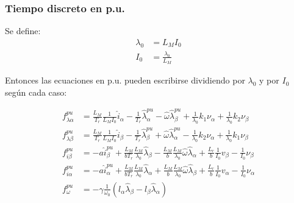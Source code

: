 \documentclass{article}
\begin{document}
        \subsubsection{Tiempo discreto en p.u.}
            Se define:
            \begin{align}
                \lambda_0 &= L_M I_0 \\
                I_0 &= \frac{\lambda_0}{L_M} 
            \end{align}

            Entonces las ecuaciones en p.u. pueden escribirse dividiendo por $\lambda_0$ y por $I_0$  según cada caso:
            
            \begin{equation}
                \begin{aligned}
                    f_{\lambda\alpha}^{pu} &=  \frac{L_M}{T_r} \frac{1}{L_M I_0} \hat{i}_\alpha 
                        - \frac{1}{T_r} \hat{\lambda}_\alpha^{pu}  
                        - \hat{\omega} \hat{\lambda}_\beta^{pu} 
                        + \frac{1}{\lambda_0} k_1\nu_\alpha + \frac{1}{\lambda_0} k_2\nu_\beta  \\
                    f_{\lambda\beta}^{pu} &=  \frac{L_M}{T_r} \frac{1}{L_M I_0} \hat{i}_\beta 
                        - \frac{1}{T_r} \hat{\lambda}_\beta^{pu}  
                        + \hat{\omega} \hat{\lambda}_\alpha^{pu} 
                        - \frac{1}{\lambda_0} k_2\nu_\alpha + \frac{1}{\lambda_0} k_1\nu_\beta  \\
                    f_{i\beta}^{pu} &=  -a  \hat{i}_\beta^{pu} 
                        + \frac{L_M}{b T_r} \frac{L_M}{\lambda_0} \hat{\lambda}_\beta  
                        - \frac{L_M}{b} \frac{L_M}{\lambda_0} \hat{\omega} \hat{\lambda}_\alpha 
                        + \frac{L_r}{b} \frac{1}{I_0} v_\beta 
                        - \frac{1}{I_0} \nu_\beta \\
                    f_{i\alpha}^{pu} &=  -a  \hat{i}_\alpha^{pu} 
                        + \frac{L_M}{b T_r} \frac{L_M}{\lambda_0} \hat{\lambda}_\alpha  
                        + \frac{L_M}{b} \frac{L_M}{\lambda_0} \hat{\omega} \hat{\lambda}_\beta 
                        + \frac{L_r}{b} \frac{1}{I_0} v_\alpha
                        - \frac{1}{I_0} \nu_\alpha \\
                    f_\omega^{pu} &=  -\gamma \frac{1}{\omega_0} \left( l_\alpha \hat{\lambda}_\beta 
                        - l_\beta \hat{\lambda}_\alpha  \right)
                \end{aligned}
            \end{equation}
            
\end{document}
